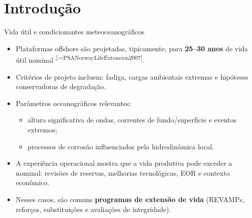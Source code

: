 \documentclass[aspectratio=169,11pt]{beamer}
\makeatletter
\renewcommand{\cite}[1]{\textsuperscript{[\@for\@tempa:=#1\do{\@tempa,}\@gobble]}}
\makeatother
\begin{document}
\section{Introdução}

\begin{frame}{Vida útil e condicionantes meteoceanográficos}
\begin{itemize}
  \item Plataformas offshore são projetadas, tipicamente, para \textbf{25--30 anos} de vida útil nominal \cite{PSANorwayLifeExtension2007}.
  \item Critérios de projeto incluem: fadiga, cargas ambientais extremas e hipóteses conservadoras de degradação.
  \item Parâmetros oceanográficos relevantes:
    \begin{itemize}
      \item altura significativa de ondas, correntes de fundo/superfície e eventos extremos;
      \item processos de corrosão influenciados pela hidrodinâmica local.
    \end{itemize}
  \item A experiência operacional mostra que a vida produtiva pode exceder a nominal: revisões de reservas, melhorias tecnológicas, EOR e contexto econômico.
  \item Nesses casos, são comuns \textbf{programas de extensão de vida} (REVAMPs, reforços, substituições e avaliações de integridade).
\end{itemize}
\end{frame}
\end{document}
